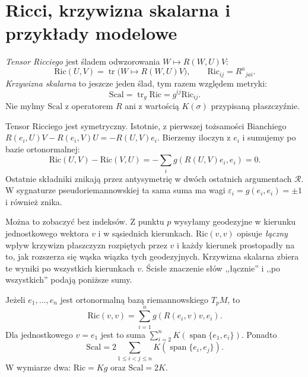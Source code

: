 \section{Ricci, krzywizna skalarna i przykłady modelowe}
\label{sec:ricci-krzywizna-skalarna}

\begin{definicja}
\label{def:ricci-skalarna}
\emph{Tensor Ricciego} jest śladem odwzorowania
$W\mapsto R(W,U)V$:
\begin{equation}\label{eq:ricci-def}
 \mathrm{Ric}(U,V)=\operatorname{tr}
              \bigl(W\longmapsto R(W,U)V\bigr),
 \qquad \mathrm{Ric}_{ij}=R^a{}_{j a i}.
\end{equation}
\emph{Krzywizna skalarna} to jeszcze jeden ślad,
tym razem względem metryki:
\begin{equation}\label{eq:scalar-def}
 \mathrm{Scal}=\operatorname{tr}_g\mathrm{Ric}
               =g^{ij}\mathrm{Ric}_{ij}.
\end{equation}
Nie mylmy $\mathrm{Scal}$ z operatorem $R$ ani
z wartością $K(\sigma)$ przypisaną płaszczyźnie.
\end{definicja}

Tensor Ricciego jest symetryczny. Istotnie, z pierwszej
tożsamości Bianchiego
$R(e_i,U)V-R(e_i,V)U=-R(U,V)e_i$.
Bierzemy iloczyn z $e_i$ i sumujemy po bazie ortonormalnej:
\[
 \mathrm{Ric}(U,V)-\mathrm{Ric}(V,U)
 =-\sum_i g(R(U,V)e_i,e_i)=0.
\]
Ostatnie składniki znikają przez antysymetrię w dwóch
ostatnich argumentach $\mathcal R$. W sygnaturze
pseudoriemannowskiej ta sama suma ma wagi
$\varepsilon_i=g(e_i,e_i)=\pm1$ i również znika.

Można to zobaczyć bez indeksów. Z punktu $p$ wysyłamy
geodezyjne w kierunku jednostkowego wektora $v$ i
w sąsiednich kierunkach. $\mathrm{Ric}(v,v)$ opisuje
\emph{łączny} wpływ krzywizn płaszczyzn rozpiętych
przez $v$ i każdy kierunek prostopadły na to, jak
rozszerza się wąska wiązka tych geodezyjnych.
Krzywizna skalarna zbiera te wyniki po wszystkich
kierunkach $v$. Ścisłe znaczenie słów ,,łącznie''
i ,,po wszystkich'' podają poniższe sumy.

\begin{stwierdzenie}
\label{prop:ricci-sekcje}
Jeżeli $e_1,\ldots,e_n$ jest ortonormalną bazą
riemannowskiego $T_pM$, to
\begin{equation}\label{eq:ricci-suma-sekcji}
 \mathrm{Ric}(v,v)
 =\sum_{i=1}^n g(R(e_i,v)v,e_i).
\end{equation}
Dla jednostkowego $v=e_1$ jest to suma
$\sum_{i=2}^n K(\operatorname{span}\{e_1,e_i\})$.
Ponadto
\begin{equation}\label{eq:scalar-suma-sekcji}
 \mathrm{Scal}=2\sum_{1\leq i<j\leq n}
                    K(\operatorname{span}\{e_i,e_j\}).
\end{equation}
W wymiarze dwa: $\mathrm{Ric}=Kg$ oraz
$\mathrm{Scal}=2K$.
\end{stwierdzenie}

